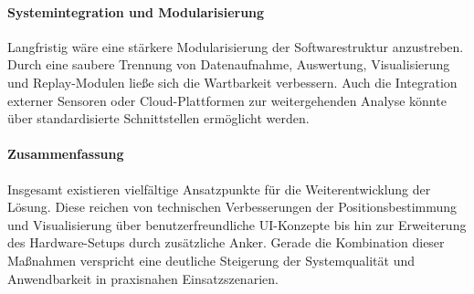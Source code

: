 \documentclass[a4paper, 12pt]{article} %
\begin{document}
\paragraph{Systemintegration und Modularisierung}
Langfristig wäre eine stärkere Modularisierung der Softwarestruktur anzustreben. Durch eine saubere Trennung von Datenaufnahme, Auswertung, 
Visualisierung und Replay-Modulen ließe sich die Wartbarkeit verbessern. Auch die Integration externer Sensoren oder Cloud-Plattformen zur 
weitergehenden Analyse könnte über standardisierte Schnittstellen ermöglicht werden.

\paragraph{Zusammenfassung}
Insgesamt existieren vielfältige Ansatzpunkte für die Weiterentwicklung der Lösung. Diese reichen von technischen Verbesserungen der 
Positionsbestimmung und Visualisierung über benutzerfreundliche \ac{UI}-Konzepte bis hin zur Erweiterung des Hardware-Setups durch zusätzliche Anker. 
Gerade die Kombination dieser Maßnahmen verspricht eine deutliche Steigerung der Systemqualität und Anwendbarkeit in praxisnahen Einsatzszenarien.





\clearpage
\begingroup
\sloppy
\nocite{*}
\printbibliography
\end{document}
